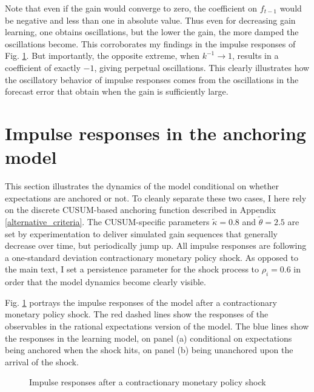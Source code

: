 \documentclass[11pt]{article}
\def \myFigPath {../../figures/}
\renewcommand{\[}{\begin{equation}}
\renewcommand{\]}{\end{equation}}
\def\mySmallerFigScale{0.18}
\def\fignameIRFanchored{command_IFS_anchoring_pretty_RIR_LH_anch_monpol_again_critCUSUM_constant_only_T_400_N_1000_burnin_5_params_psi_pi_1_5_psi_x_0_gbar_0_145_thetbar_16_thettilde_2_5_kap_0_8_lamx_0_lami_0_date_2020_06_05}
\def\fignameIRFunanchored{command_IFS_anchoring_pretty_RIR_LH_unanch_monpol_again_critCUSUM_constant_only_T_400_N_1000_burnin_5_params_psi_pi_1_5_psi_x_0_gbar_0_145_thetbar_16_thettilde_2_5_kap_0_8_lamx_0_lami_0_date_2020_06_05}
\begin{document}
Note that even if the gain would converge to zero, the coefficient on $f_{t-1}$ would be negative and less than one in absolute value. Thus even for decreasing gain learning, one obtains oscillations, but the lower the gain, the more damped the oscillations become. This corroborates my findings in the impulse responses of Fig. \ref{IRF}. But importantly, the opposite extreme, when $k^{-1}\rightarrow 1$, results in a coefficient of exactly $-1$, giving perpetual oscillations. This clearly illustrates how the oscillatory behavior of impulse responses comes from the oscillations in the forecast error that obtain when the gain is sufficiently large. 

\section{Impulse responses in the anchoring model}\label{app_IRFs}
This section illustrates the dynamics of the model conditional on whether expectations are anchored or not. To cleanly separate these two cases, I here rely on the discrete CUSUM-based anchoring function described in Appendix \ref{alternative_criteria}. The CUSUM-specific parameters $\tilde{\kappa} = 0.8$ and $\tilde{\theta}=2.5$ are set by experimentation to deliver simulated gain sequences that generally decrease over time, but periodically jump up. All impulse responses are following a one-standard deviation contractionary monetary policy shock. As opposed to the main text, I set a persistence parameter for the shock process to $\rho_i = 0.6$ in order that the model dynamics become clearly visible.

Fig. \ref{IRF} portrays the impulse responses of the model after a contractionary monetary policy shock. The red dashed lines show the responses of the observables in the rational expectations version of the model. The blue lines show the responses in the learning model, on panel (a) conditional on expectations being anchored when the shock hits, on panel (b) being unanchored upon the arrival of the shock. 

\begin{figure}[h!]
\caption{Impulse responses after a contractionary monetary policy shock}
\label{IRF}
\end{figure}
\end{document}
